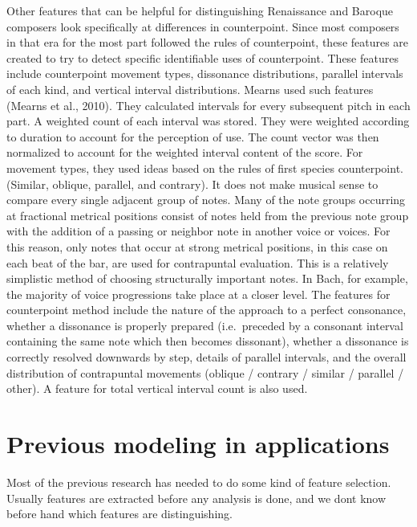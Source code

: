 \documentclass[12pt,twoside]{reedthesis}
\theoremstyle{definition}
\theoremstyle{definition}
\theoremstyle{definition}
\theoremstyle{remark}
\begin{document}
Other features that can be helpful for distinguishing Renaissance and
Baroque composers look specifically at differences in counterpoint.
Since most composers in that era for the most part followed the rules of
counterpoint, these features are created to try to detect specific
identifiable uses of counterpoint. These features include counterpoint
movement types, dissonance distributions, parallel intervals of each
kind, and vertical interval distributions. Mearns used such features
(Mearns et al., 2010). They calculated intervals for every subsequent
pitch in each part. A weighted count of each interval was stored. They
were weighted according to duration to account for the perception of
use. The count vector was then normalized to account for the weighted
interval content of the score. For movement types, they used ideas based
on the rules of first species counterpoint. (Similar, oblique, parallel,
and contrary). It does not make musical sense to compare every single
adjacent group of notes. Many of the note groups occurring at fractional
metrical positions consist of notes held from the previous note group
with the addition of a passing or neighbor note in another voice or
voices. For this reason, only notes that occur at strong metrical
positions, in this case on each beat of the bar, are used for
contrapuntal evaluation. This is a relatively simplistic method of
choosing structurally important notes. In Bach, for example, the
majority of voice progressions take place at a closer level. The
features for counterpoint method include the nature of the approach to a
perfect consonance, whether a dissonance is properly prepared
(i.e.~preceded by a consonant interval containing the same note which
then becomes dissonant), whether a dissonance is correctly resolved
downwards by step, details of parallel intervals, and the overall
distribution of contrapuntal movements (oblique / contrary / similar /
parallel / other). A feature for total vertical interval count is also
used.

\section{Previous modeling in
applications}\label{previous-modeling-in-applications}

Most of the previous research has needed to do some kind of feature
selection. Usually features are extracted before any analysis is done,
and we dont know before hand which features are distinguishing.
\end{document}
